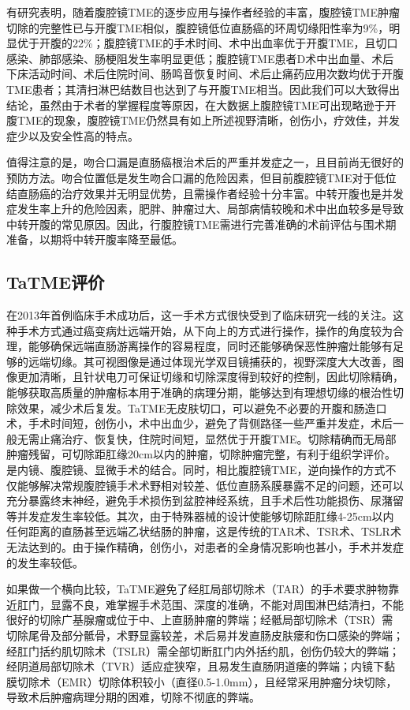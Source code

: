 \documentclass[a4paper,11pt,onecolumn,twoside]{article}
\begin{document}
\begin{multicols}{2}
    有研究表明，随着腹腔镜TME的逐步应用与操作者经验的丰富，腹腔镜TME肿瘤切除的完整性已与开腹TME相似，腹腔镜低位直肠癌的环周切缘阳性率为9\%，明显优于开腹的22\%；腹腔镜TME的手术时间、术中出血率优于开腹TME，且切口感染、肺部感染、肠梗阻发生率明显更低\supercite{2,18}；腹腔镜TME患者D术中出血量、术后下床活动时间、术后住院时间、肠鸣音恢复时间、术后止痛药应用次数均优于开腹TME患者\supercite{19,20}；其清扫淋巴结数目也达到了与开腹TME相当\supercite{W3}。因此我们可以大致得出结论，虽然由于术者的掌握程度等原因，在大数据上腹腔镜TME可出现略逊于开腹TME的现象，腹腔镜TME仍然具有如上所述视野清晰，创伤小，疗效佳，并发症少以及安全性高的特点。

    值得注意的是，吻合口漏是直肠癌根治术后的严重并发症之一，且目前尚无很好的预防方法。吻合位置低是发生吻合口漏的危险因素，但目前腹腔镜TME对于低位结直肠癌的治疗效果并无明显优势，且需操作者经验十分丰富\supercite{W6}。中转开腹也是并发症发生率上升的危险因素，肥胖、肿瘤过大、局部病情较晚和术中出血较多是导致中转开腹的常见原因\supercite{W4}。因此，行腹腔镜TME需进行完善准确的术前评估与围术期准备，以期将中转开腹率降至最低。
    \subsection{TaTME评价}
    在2013年首例临床手术成功后，这一手术方式很快受到了临床研究一线的关注。这种手术方式通过癌变病灶远端开始，从下向上的方式进行操作，操作的角度较为合理，能够确保远端直肠游离操作的容易程度，同时还能够确保恶性肿瘤灶能够有足够的远端切缘。其可视图像是通过体现光学双目镜捕获的，视野深度大大改善，图像更加清晰，且针状电刀可保证切缘和切除深度得到较好的控制，因此切除精确，能够获取高质量的肿瘤标本用于准确的病理分期，能够达到有理想切缘的根治性切除效果，减少术后复发。TaTME无皮肤切口，可以避免不必要的开腹和肠造口术，手术时间短，创伤小，术中出血少，避免了背侧路径一些严重并发症，术后一般无需止痛治疗、恢复快，住院时间短，显然优于开腹TME。切除精确而无局部肿瘤残留，可切除距肛缘20cm以内的肿瘤，切除肿瘤完整，有利于组织学评价。是内镜、腹腔镜、显微手术的结合。同时，相比腹腔镜TME，逆向操作的方式不仅能够解决常规腹腔镜手术术野相对较差、低位直肠系膜暴露不足的问题，还可以充分暴露终末神经，避免手术损伤到盆腔神经系统，且手术后性功能损伤、尿潴留等并发症发生率较低\supercite{W8}。其次，由于特殊器械的设计使能够切除距肛缘4-25cm以内任何距离的直肠甚至远端乙状结肠的肿瘤，这是传统的TAR术、TSR术、TSLR术无法达到的。由于操作精确，创伤小，对患者的全身情况影响也甚小，手术并发症的发生率较低\supercite{W2,W6}。

    如果做一个横向比较，TaTME避免了经肛局部切除术（TAR）的手术要求肿物靠近肛门，显露不良，难掌握手术范围、深度的准确，不能对周围淋巴结清扫，不能很好的切除广基腺瘤或位于中、上直肠肿瘤的弊端；经骶局部切除术（TSR）需切除尾骨及部分骶骨，术野显露较差，术后易并发直肠皮肤瘘和伤口感染的弊端；经肛门括约肌切除术（TSLR）需全部切断肛门内外括约肌，创伤仍较大的弊端；经阴道局部切除术（TVR）适应症狭窄，且易发生直肠阴道瘘的弊端；内镜下黏膜切除术（EMR）切除体积较小（直径0.5-1.0mm），且经常采用肿瘤分块切除，导致术后肿瘤病理分期的困难，切除不彻底的弊端。


\end{multicols}
\end{document}

